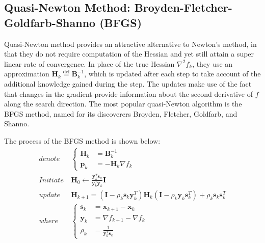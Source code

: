 \subsection{Quasi-Newton Method: Broyden-Fletcher-Goldfarb-Shanno (BFGS)}\label{sec:BFGS}
Quasi-Newton method provides an attractive alternative to Newton's method, in that they do not require computation of the Hessian and yet still attain a super linear rate of convergence. In place of the true Hessian $\nabla^2 f_k$, they use an approximation $\textbf{H}_k \stackrel{\text{def}}{=} \textbf{B}_k^{-1}$, which is updated after each step to take account of the additional knowledge gained during the step. The updates make use of the fact that changes in the gradient provide information about the second derivative of $f$ along the search direction. The most popular quasi-Newton algorithm is the BFGS method, named for its discoverers Broyden, Fletcher, Goldfarb, and Shanno. \cite{Nocedal2006}

The process of the BFGS method is shown below:
\begin{align}
  denote   & \                       \left\{
  \begin{array}{ll}
    \textbf{H}_k & = \textbf{B}_k^{-1}          \\
    \textbf{p}_k & = -\textbf{H}_k \nabla f_{k}
  \end{array}
  \right.                                                                                                                                                                                                        \\
  Initiate & \ \textbf{H}_0     \leftarrow \frac{\textbf{y}_k^T\textbf{s}_k}{\textbf{y}_k^T\textbf{y}_k}\textbf{I}                                                           \label{eq:BFGS_initiate_H_0}        \\
  update   & \ \textbf{H}_{k+1}  = (\textbf{I} - \rho_k\textbf{s}_k\textbf{y}_k^T) \textbf{H}_{k} (\textbf{I} - \rho_k\textbf{y}_k\textbf{s}_k^T) +\rho_k\textbf{s}_k\textbf{s}_k^T \label{eq:BFGS_update_H_k+1} \\
  where    & \                        \left\{
  \begin{array}{ll}
    \textbf{s}_k & = \textbf{x}_{k+1} - \textbf{x}_{k}                               \\
    \textbf{y}_k & = \nabla f_{k+1} - \nabla f_{k}                                   \\
    \rho_k       & = \frac{1}{\textbf{y}_k^T\textbf{s}_k} \label{eq:BFGS_calc_rho_k}
  \end{array}
  \right.
\end{align}

